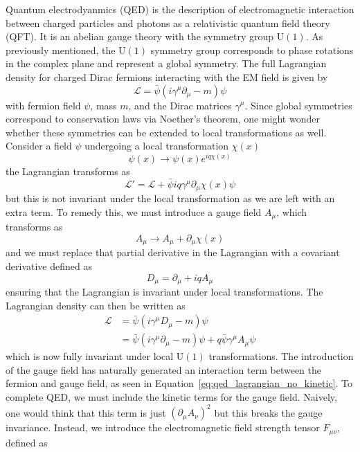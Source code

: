 Quantum electrodyanmics (QED) is the description of electromagnetic interaction between charged particles and photons as a relativistic quantum field theory (QFT). It is an abelian gauge theory with the symmetry group $\mathrm{U}(1)$. As previously mentioned, the $\mathrm{U}(1)$ symmetry group corresponds to phase rotations in the complex plane and represent a global symmetry. The full Lagrangian density for charged Dirac fermions interacting with the EM field is given by
\begin{equation}
  \mathcal{L} = \bar{\psi}(i\gamma^{\mu}\partial_{\mu} - m)\psi 
  \label{eq:qed_dirac_lagrangian}
\end{equation}
with fermion field $\psi$, mass $m$, and the Dirac matrices $\gamma^{\mu}$. Since global symmetries correspond to conservation laws via Noether's theorem, one might wonder whether these symmetries can be extended to local transformations as well. Consider a field $\psi$ undergoing a local transformation $\chi(x)$
\begin{equation}
  \psi(x) \to \psi(x)e^{i q\chi(x)} 
  \label{eq:qed_local_symmetry}
\end{equation}
the Lagrangian transforms as
\begin{equation}
  \mathcal{L}' = \mathcal{L} + \bar{\psi} iq\gamma^{\mu}\partial_{\mu}\chi(x) \psi
  \label{eq:qed_local_lagrangian}
\end{equation}
but this is not invariant under the local transformation as we are left with an extra term. To remedy this, we must introduce a gauge field $A_{\mu}$, which transforms as
\begin{equation}
  A_{\mu} \to A_{\mu} + \partial_{\mu}\chi(x)
  \label{eq:qed_gauge_transformation}
\end{equation}
and we must replace that partial derivative in the Lagrangian with a covariant derivative defined as
\begin{equation}
  D_{\mu} = \partial_{\mu} + iqA_{\mu}
  \label{eq:qed_covariant_derivative}
\end{equation}
ensuring that the Lagrangian is invariant under local transformations. The Lagrangian density can then be written as
\begin{align}
  \mathcal{L} 
  &= \bar{\psi}(i\gamma^{\mu}D_{\mu} - m)\psi \nonumber \\
  &= \bar{\psi}(i\gamma^{\mu}\partial_{\mu} - m)\psi + q\bar{\psi}\gamma^{\mu}A_{\mu}\psi 
  \label{eq:qed_lagrangian_no_kinetic}
\end{align}
which is now fully invariant under local $\mathrm{U}(1)$ transformations. The introduction of the gauge field has naturally generated an interaction term between the fermion and gauge field, as seen in Equation~\ref{eq:qed_lagrangian_no_kinetic}. To complete QED, we must include the kinetic terms for the gauge field. Naively, one would think that this term is just ${(\partial_{\mu}A_{\nu})}^{2}$ but this breaks the gauge invariance. Instead, we introduce the electromagnetic field strength tensor $F_{\mu\nu}$, defined as
